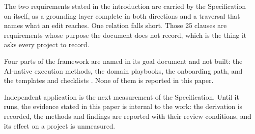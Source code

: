The two requirements stated in the introduction are carried by the Specification on itself, as a grounding layer complete in both directions and a traversal that names what an edit reaches. One relation falls short. Those 25 clauses are requirements whose purpose the document does not record, which is the thing it asks every project to record.

Four parts of the framework are named in its goal document and not built: the AI-native execution methods, the domain playbooks, the onboarding path, and the templates and checklists \citep{goal2026}. None of them is reported in this paper.

Independent application is the next measurement of the Specification. Until it runs, the evidence stated in this paper is internal to the work: the derivation is recorded, the methods and findings are reported with their review conditions, and its effect on a project is unmeasured.

